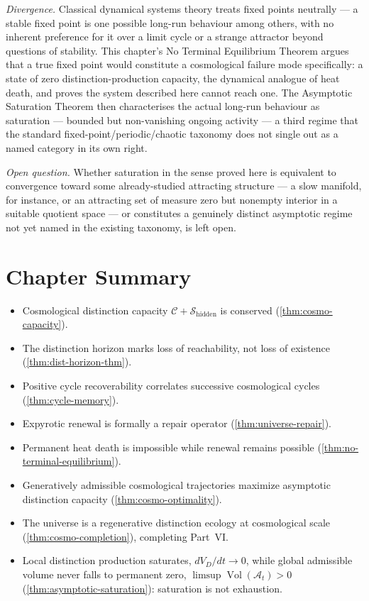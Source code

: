 \documentclass[12pt,twoside,openright]{book}
\newcommand{\Vol}{\operatorname{Vol}}
\newenvironment{chapsummary}{%
  \begin{tcolorbox}[colback=DistBlue!5,colframe=DistBlue,
    title={\faBookOpen\enspace Summary},
    fonttitle=\sffamily\bfseries\color{white},
    attach boxed title to top left={yshift=-2mm,xshift=4mm},
    boxed title style={colback=DistBlue,rounded corners}]
  \begin{itemize}[nosep,leftmargin=*]}{%
  \end{itemize}\end{tcolorbox}}
\begin{document}
\emph{Divergence.} Classical dynamical systems theory treats
fixed points neutrally --- a stable fixed point is one possible
long-run behaviour among others, with no inherent preference for
it over a limit cycle or a strange attractor beyond questions of
stability. This chapter's No Terminal Equilibrium Theorem argues
that a true fixed point would constitute a cosmological failure
mode specifically: a state of zero distinction-production
capacity, the dynamical analogue of heat death, and proves the
system described here cannot reach one. The Asymptotic Saturation
Theorem then characterises the actual long-run behaviour as
saturation --- bounded but non-vanishing ongoing activity ---
a third regime that the standard fixed-point/periodic/chaotic
taxonomy does not single out as a named category in its own
right.

\emph{Open question.} Whether saturation in the sense proved here
is equivalent to convergence toward some already-studied
attracting structure --- a slow manifold, for instance, or an
attracting set of measure zero but nonempty interior in a
suitable quotient space --- or constitutes a genuinely distinct
asymptotic regime not yet named in the existing taxonomy, is left
open.

\section*{Chapter Summary}
\begin{chapsummary}
  \item Cosmological distinction capacity
        $\mathcal{C} + \mathcal{S}_{\mathrm{hidden}}$ is
        conserved (\cref{thm:cosmo-capacity}).
  \item The distinction horizon marks loss of
        reachability, not loss of existence
        (\cref{thm:dist-horizon-thm}).
  \item Positive cycle recoverability correlates
        successive cosmological cycles
        (\cref{thm:cycle-memory}).
  \item Expyrotic renewal is formally a repair operator
        (\cref{thm:universe-repair}).
  \item Permanent heat death is impossible while renewal
        remains possible (\cref{thm:no-terminal-equilibrium}).
  \item Generatively admissible cosmological trajectories
        maximize asymptotic distinction capacity
        (\cref{thm:cosmo-optimality}).
  \item The universe is a regenerative distinction ecology
        at cosmological scale
        (\cref{thm:cosmo-completion}), completing Part~VI.
  \item Local distinction production saturates,
        $dV_D/dt\to0$, while global admissible volume never
        falls to permanent zero,
        $\limsup\Vol(\mathcal{A}_t)>0$
        (\cref{thm:asymptotic-saturation}): saturation is not
        exhaustion.
\end{chapsummary}
\end{document}
